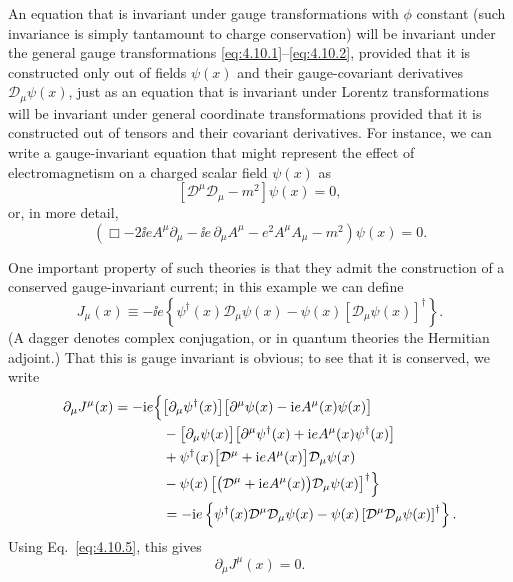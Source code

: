 An equation that is invariant under gauge transformations with \(\phi\)
constant (such invariance is simply tantamount to charge conservation) will
be invariant under the general gauge transformations
\eqref{eq:4.10.1}--\eqref{eq:4.10.2}, provided that it is constructed only
out of fields \(\psi(x)\) and their gauge-covariant derivatives
\(\mathcal D_\mu\psi(x)\), just as an equation that is invariant under
Lorentz transformations will be invariant under general coordinate
transformations provided that it is constructed out of tensors and their
covariant derivatives. For instance, we can write a gauge-invariant equation
that might represent the effect of electromagnetism on a charged scalar
field \(\psi(x)\) as
\begin{equation}
  \left[\mathcal D^\mu\mathcal D_\mu-m^2\right]\psi(x)=0,
  \tag{4.10.5}\label{eq:4.10.5}
\end{equation}
or, in more detail,
\[
  \left(
    \Box
    -2\ii eA^\mu\partial_\mu
    -\ii e\,\partial_\mu A^\mu
    -e^2A^\mu A_\mu
    -m^2
  \right)\psi(x)=0.
\]

One important property of such theories is that they admit the construction
of a conserved gauge-invariant current; in this example we can define
\[
  J_\mu(x)
  \equiv
  -\ii e
  \left\{
    \psi^\dagger(x)\mathcal D_\mu\psi(x)
    -\psi(x)\left[\mathcal D_\mu\psi(x)\right]^\dagger
  \right\}.
\]
(A dagger denotes complex conjugation, or in quantum theories the Hermitian
adjoint.) That this is gauge invariant is obvious; to see that it is
conserved, we write
\begin{align*}
  \partial_\mu J^\mu(x)
  =-\mathrm{i} e\Bigl\{&
    \bigl[\partial_\mu\psi^\dagger(x)\bigr]
    \bigl[\partial^\mu\psi(x)-\mathrm{i} eA^\mu(x)\psi(x)\bigr]
    \\
    &-
    \bigl[\partial_\mu\psi(x)\bigr]
    \bigl[\partial^\mu\psi^\dagger(x)+\mathrm{i} eA^\mu(x)\psi^\dagger(x)\bigr]
    \\
    &+
    \psi^\dagger(x)
    \bigl[\mathcal D^\mu+\mathrm{i} eA^\mu(x)\bigr]
    \mathcal D_\mu\psi(x)
    \\
    &-
    \psi(x)
    \left[
      \bigl(\mathcal D^\mu+\mathrm{i} eA^\mu(x)\bigr)
      \mathcal D_\mu\psi(x)
    \right]^\dagger
  \Bigr\}
  \\
  &=
  -\mathrm{i} e\left\{
    \psi^\dagger(x)\mathcal D^\mu\mathcal D_\mu\psi(x)
    -
    \psi(x)
    \left[\mathcal D^\mu\mathcal D_\mu\psi(x)\right]^\dagger
  \right\}.
\end{align*}
Using Eq.~\eqref{eq:4.10.5}, this gives
\[
  \partial_\mu J^\mu(x)=0.
\]


